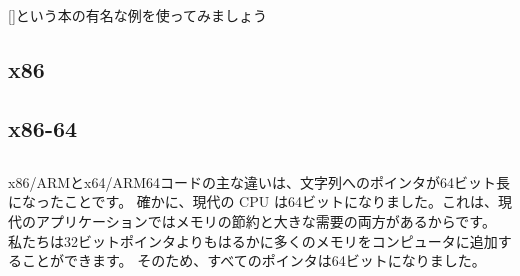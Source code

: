 \section{\HelloWorldSectionName}
\label{sec:helloworld}

[\KRBook]という本の有名な例を使ってみましょう



\subsection{x86}





\subsection{x86-64}








\subsection{\Conclusion{}}

x86/ARMとx64/ARM64コードの主な違いは、文字列へのポインタが64ビット長になったことです。
確かに、現代の \ac{CPU} は64ビットになりました。これは、現代のアプリケーションではメモリの節約と大きな需要の両方があるからです。
私たちは32ビットポインタよりもはるかに多くのメモリをコンピュータに追加することができます。
そのため、すべてのポインタは64ビットになりました。


